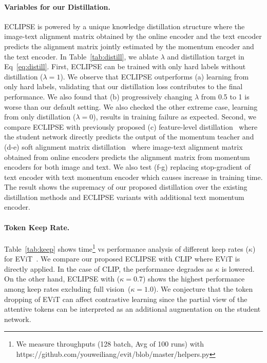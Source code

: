 \paragraph{Variables for our Distillation.}
ECLIPSE is powered by a unique knowledge distillation structure where the image-text alignment matrix obtained by the online encoder and the text encoder predicts the alignment matrix jointly estimated by the momentum encoder and the text encoder.
In Table~\ref{tab:distill}, we ablate $\lambda$ and distillation target in Eq~\ref{eq:distill}.
First, ECLIPSE can be trained with only hard labels without distillation ($\lambda=1$).
We observe that ECLIPSE outperforms (a) learning from only hard labels, validating that our distillation loss contributes to the final performance.
We also found that (b) progressively changing $\lambda$ from 0.5 to 1 is worse than our default setting.
We also checked the other extreme case, learning from only distillation ($\lambda=0$), results in training failure as expected.
Second, we compare ECLIPSE with previously proposed (c) feature-level distillation~\cite{caron2021emerging} where the student network directly predicts the output of the momentum teacher and (d-e) soft alignment matrix distillation~\cite{li2021align,Lu2022COTS} where image-text alignment matrix obtained from online encoders predicts the alignment matrix from momentum encoders for both image and text.
We also test (f-g) replacing stop-gradient of text encoder with text momentum encoder which causes increase in training time.
The result shows the supremacy of our proposed distillation over the existing distillation methods and ECLIPSE variants with additional text momentum encoder.

\paragraph{Token Keep Rate.}
Table~\ref{tab:keep} shows time\footnote{We measure throughputs (128 batch, Avg of 100 runs) with https://github.com/youweiliang/evit/blob/master/helpers.py} vs performance analysis of different keep rates ($\kappa$) for EViT~\cite{liang2022evit}.
We compare our proposed ECLIPSE with CLIP where EViT is directly applied.
In the case of CLIP, the performance degrades as $\kappa$ is lowered.
On the other hand, ECLIPSE with ($\kappa=0.7$) shows the highest performance among keep rates excluding full vision~($\kappa=1.0$).
We conjecture that the token dropping of EViT can affect contrastive learning since the partial view of the attentive tokens can be interpreted as an additional augmentation on the student network.

